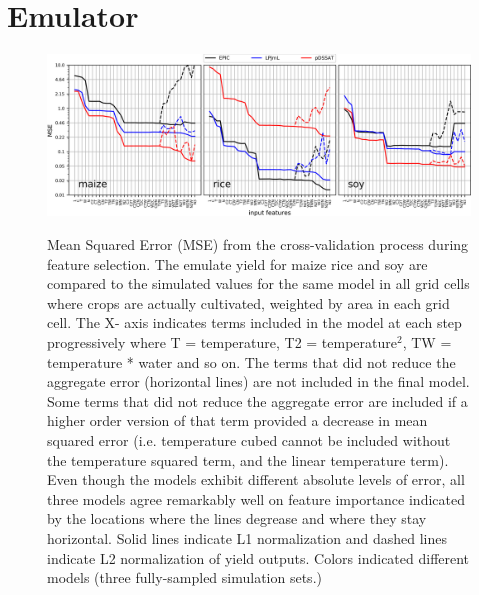 \documentclass[10pt]{article}
\begin{document}
\clearpage
\section{Emulator}
\begin{figure}[h!]
\includegraphics[width=\textwidth]{s_feature_selection.png}\\
\caption{Mean Squared Error (MSE) from the cross-validation process during feature selection. The emulate yield for maize rice and soy are compared to the simulated values for the same model in all grid cells where crops are actually cultivated, weighted by area in each grid cell. The X- axis indicates terms included in the model at each step progressively where T = temperature, T2 = temperature$^{2}$, TW  = temperature * water and so on. The terms that did not reduce the aggregate error (horizontal lines) are not included in the final model. Some terms that did not reduce the aggregate error are included if a higher order version of that term provided a decrease in mean squared error (i.e. temperature cubed cannot be included without the temperature squared term, and the linear temperature term). Even though the models exhibit different absolute levels of error, all three models agree remarkably well on feature importance indicated by the locations where the lines degrease and where they stay horizontal. Solid lines indicate L1 normalization and dashed lines indicate L2 normalization of yield outputs. Colors indicated different models (three fully-sampled simulation sets.)}
\label{fig:featureselection}
\end{figure}

\clearpage
\end{document}
